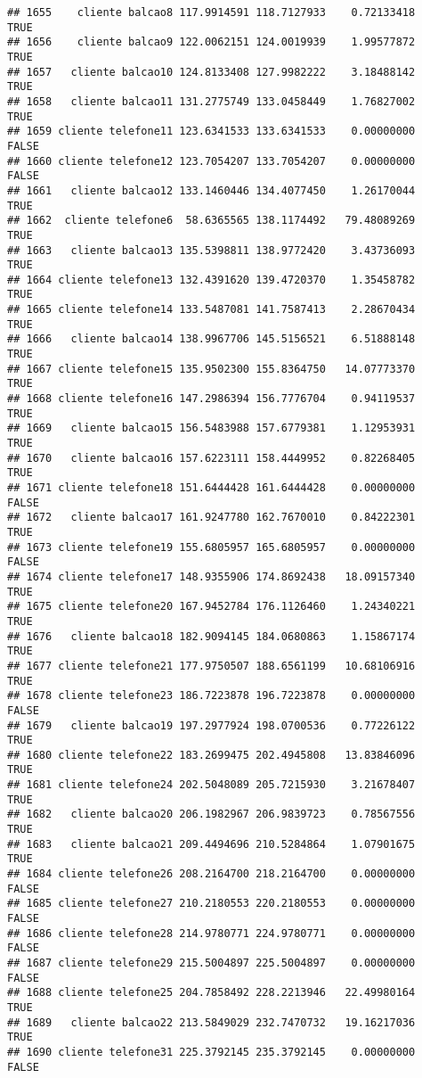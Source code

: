 \documentclass[
]{article}
\begin{document}
\begin{verbatim}
## 1655    cliente balcao8 117.9914591 118.7127933    0.72133418     TRUE
## 1656    cliente balcao9 122.0062151 124.0019939    1.99577872     TRUE
## 1657   cliente balcao10 124.8133408 127.9982222    3.18488142     TRUE
## 1658   cliente balcao11 131.2775749 133.0458449    1.76827002     TRUE
## 1659 cliente telefone11 123.6341533 133.6341533    0.00000000    FALSE
## 1660 cliente telefone12 123.7054207 133.7054207    0.00000000    FALSE
## 1661   cliente balcao12 133.1460446 134.4077450    1.26170044     TRUE
## 1662  cliente telefone6  58.6365565 138.1174492   79.48089269     TRUE
## 1663   cliente balcao13 135.5398811 138.9772420    3.43736093     TRUE
## 1664 cliente telefone13 132.4391620 139.4720370    1.35458782     TRUE
## 1665 cliente telefone14 133.5487081 141.7587413    2.28670434     TRUE
## 1666   cliente balcao14 138.9967706 145.5156521    6.51888148     TRUE
## 1667 cliente telefone15 135.9502300 155.8364750   14.07773370     TRUE
## 1668 cliente telefone16 147.2986394 156.7776704    0.94119537     TRUE
## 1669   cliente balcao15 156.5483988 157.6779381    1.12953931     TRUE
## 1670   cliente balcao16 157.6223111 158.4449952    0.82268405     TRUE
## 1671 cliente telefone18 151.6444428 161.6444428    0.00000000    FALSE
## 1672   cliente balcao17 161.9247780 162.7670010    0.84222301     TRUE
## 1673 cliente telefone19 155.6805957 165.6805957    0.00000000    FALSE
## 1674 cliente telefone17 148.9355906 174.8692438   18.09157340     TRUE
## 1675 cliente telefone20 167.9452784 176.1126460    1.24340221     TRUE
## 1676   cliente balcao18 182.9094145 184.0680863    1.15867174     TRUE
## 1677 cliente telefone21 177.9750507 188.6561199   10.68106916     TRUE
## 1678 cliente telefone23 186.7223878 196.7223878    0.00000000    FALSE
## 1679   cliente balcao19 197.2977924 198.0700536    0.77226122     TRUE
## 1680 cliente telefone22 183.2699475 202.4945808   13.83846096     TRUE
## 1681 cliente telefone24 202.5048089 205.7215930    3.21678407     TRUE
## 1682   cliente balcao20 206.1982967 206.9839723    0.78567556     TRUE
## 1683   cliente balcao21 209.4494696 210.5284864    1.07901675     TRUE
## 1684 cliente telefone26 208.2164700 218.2164700    0.00000000    FALSE
## 1685 cliente telefone27 210.2180553 220.2180553    0.00000000    FALSE
## 1686 cliente telefone28 214.9780771 224.9780771    0.00000000    FALSE
## 1687 cliente telefone29 215.5004897 225.5004897    0.00000000    FALSE
## 1688 cliente telefone25 204.7858492 228.2213946   22.49980164     TRUE
## 1689   cliente balcao22 213.5849029 232.7470732   19.16217036     TRUE
## 1690 cliente telefone31 225.3792145 235.3792145    0.00000000    FALSE

\end{verbatim}
\end{document}
